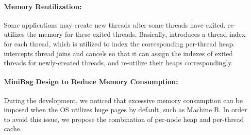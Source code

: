 \paragraph{Memory Reutilization:} Some applications may create new threads after some threads have exited. \NM{} re-utilizes the memory for these exited threads. Basically, \NM{} introduces a thread index for each thread, which is utilized to index the corresponding per-thread heap.  \NM{} intercepts thread joins and cancels so that it can assign the indexes of exited threads for newly-created threads, and re-utilize their heaps correspondingly.  


\paragraph{MiniBag Design to Reduce Memory Consumption:} During the development, we noticed that excessive memory consumption  can be imposed when the OS utilizes huge pages by default, such as Machine B. In order to avoid this issue, we propose the combination of per-node heap and per-thread cache. 

 

